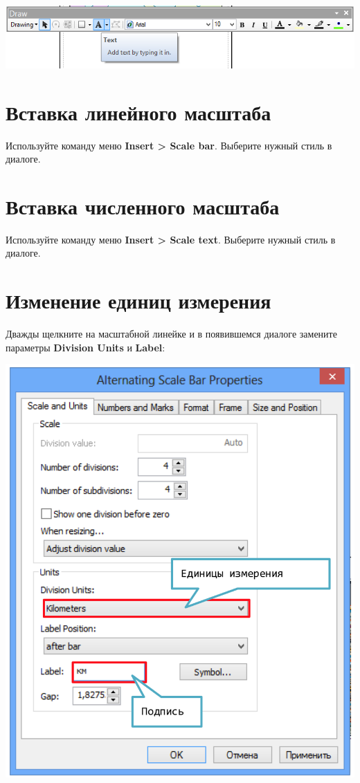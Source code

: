 \documentclass[12pt,]{book}
\begin{document}
\includegraphics{images/Appendix/image55.png}

\hypertarget{section-52}{%
\section{Вставка линейного масштаба}\label{section-52}}

Используйте команду меню \textbf{Insert \textgreater{} Scale bar}. Выберите нужный стиль в диалоге.

\hypertarget{section-53}{%
\section{Вставка численного масштаба}\label{section-53}}

Используйте команду меню \textbf{Insert \textgreater{} Scale text}. Выберите нужный стиль в диалоге.

\hypertarget{section-54}{%
\section{Изменение единиц измерения}\label{section-54}}

Дважды щелкните на масштабной линейке и в появившемся диалоге замените параметры \textbf{Division Units} и \textbf{Label}:

\includegraphics{images/Appendix/image56.png}
\end{document}
